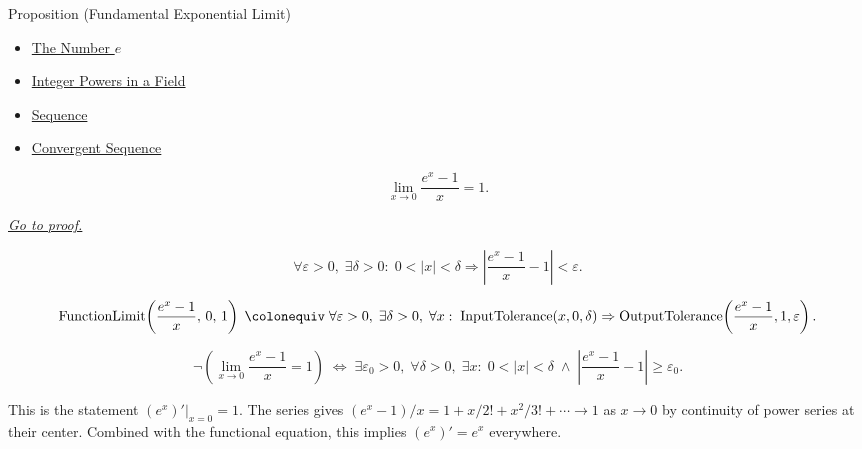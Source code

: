 \begin{propositionbox}{Proposition (Fundamental Exponential Limit)}

\begin{dependencies}
\begin{itemize}
  \item \hyperref[def:number-e]{The Number $e$}
  \item \hyperref[def:two-sided-inverse]{Integer Powers in a Field}
  \item \hyperref[def:sequence]{Sequence}
  \item \hyperref[def:convergent-sequence]{Convergent Sequence}
\end{itemize}
\end{dependencies}
\begin{proposition}
\label{prop:limit-exponential-fundamental}
\[
  \lim_{x \to 0} \frac{e^x - 1}{x} = 1.
\]

\smallskip\noindent
\hyperref[prf:limit-exponential-fundamental]{\textit{Go to proof.}}
\end{proposition}
\end{propositionbox}\begin{remark*}
\[
  \forall\varepsilon > 0,\;
  \exists\delta > 0 :\;
  0 < |x| < \delta \Rightarrow
  \left|\frac{e^x - 1}{x} - 1\right| < \varepsilon.
\]
\end{remark*}

\begin{remark*}
\[
  \operatorname{FunctionLimit}\!\left(\frac{e^x-1}{x},\,0,\,1\right)
  \;\colonequiv\;
  \forall\varepsilon>0,\;\exists\delta>0,\;\forall x:\;
  \operatorname{InputTolerance}(x,0,\delta)
  \Rightarrow
  \operatorname{OutputTolerance}\!\left(\frac{e^x-1}{x},1,\varepsilon\right).
\]
\end{remark*}

\begin{remark*}
\[
  \neg\left(\lim_{x\to 0}\frac{e^x-1}{x}=1\right)
  \;\iff\;
  \exists\varepsilon_0>0,\;\forall\delta>0,\;\exists x:\;
  0<|x|<\delta \;\wedge\; \left|\frac{e^x-1}{x}-1\right|\geq\varepsilon_0.
\]
\end{remark*}

\begin{remark*}[Interpretation]
This is the statement $(e^x)'\big|_{x=0} = 1$. The series gives
$(e^x - 1)/x = 1 + x/2! + x^2/3! + \cdots \to 1$ as $x \to 0$
by continuity of power series at their center. Combined with the
functional equation, this implies $(e^x)' = e^x$ everywhere.
\end{remark*}


